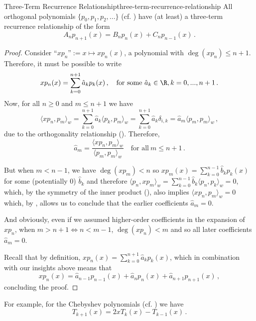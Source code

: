 \begin{theorem}{Three-Term Recurrence Relationship}{three-term-recurrence-relationship}
  All orthogonal polynomials $\{p_0, p_1, p_2, ...\}$ (cf. ) have (at least) a three-term recurrence relationship of the form
  $$A_n p_{n+1}(x) = B_n p_n(x) + C_n p_{n-1}(x)\,.$$
\end{theorem}
\begin{proof}
  Consider ``$x p_n$''$:= x \mapsto x p_n(x)$, a polynomial with $\deg(x p_n) \le n+1$.
  Therefore, it must be possible to write
  $$x p_n(x) = \sum_{k=0}^{n+1} \hat{a}_k p_k(x)\,,\quad \text{for some}~\hat{a}_k \in \R, k=0, ..., n+1\,.$$
  Now, for all $n \ge 0$ and $m \le n+1$ we have
  $$\langle xp_n, p_m \rangle_w = \sum_{k=0}^{n+1} \hat{a}_k \langle p_k, p_m \rangle_w = \sum_{k=0}^{n+1} \hat{a}_k \delta_{i,k} = \hat{a}_m \langle p_m, p_m \rangle_w\,,$$
  due to the orthogonality relationship ().
  Therefore,
  \begin{equation}
    \hat{a}_m = \frac{\langle xp_n, p_m \rangle_w}{\langle p_m, p_m \rangle_w} \quad\text{for all}~m \le n+1\,.
    \label{eq:three-term-step}
  \end{equation}

  But when $m < n-1$, we have $\deg(xp_m) < n$ so $x p_m(x) = \sum_{k=0}^{n-1} \hat{b}_k p_k(x)$ for some (potentially 0) $\hat{b}_k$ and therefore $\langle p_n, xp_m \rangle_w = \sum_{k=0}^{n-1} \hat{b}_k \langle p_n, p_k \rangle_w = 0$,
  which, by the symmetry of the inner product (), also implies $\langle x p_n, p_m \rangle_w = 0$ which, by , allows us to conclude that the earlier coefficients $\hat{a}_m = 0$.

  And obviously, even if we assumed higher-order coefficients in the expansion of $xp_n$, when $m > n+1 \Leftrightarrow n < m-1$, $\deg(xp_n) < m$ and so all later coefficients $\hat{a}_m = 0$.

  Recall that by definition, $xp_n(x) = \sum_{k=0}^{n+1} \hat{a}_k p_k(x)$, which in combination with our insights above means that
  $$xp_n(x) = \hat{a}_{n-1} p_{n-1}(x) + \hat{a}_{n} p_n(x) + \hat{a}_{n+1} p_{n+1}(x)\,,$$
  concluding the proof.
\end{proof}

For example, for the Chebyshev polynomials (cf. ) we have
$$T_{k+1}(x) = 2x T_k(x) - T_{k-1}(x) \,.$$

